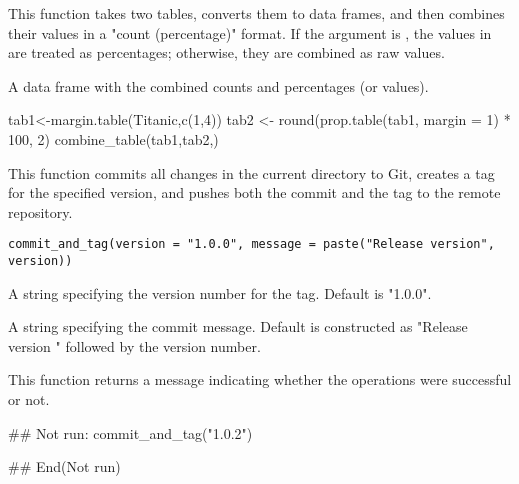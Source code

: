 \documentclass[a4paper]{book}
\begin{document}
%
\begin{Details}
This function takes two tables, converts them to data frames, and then combines their values in a "count (percentage)" format. If the  argument is , the values in  are treated as percentages; otherwise, they are combined as raw values.
\end{Details}
%
\begin{Value}
A data frame with the combined counts and percentages (or values).
\end{Value}
%
\begin{Examples}
\begin{ExampleCode}
tab1<-margin.table(Titanic,c(1,4))
tab2 <- round(prop.table(tab1, margin = 1) * 100, 2)
combine_table(tab1,tab2,)

\end{ExampleCode}
\end{Examples}
%
\begin{Description}
This function commits all changes in the current directory to Git, creates a
tag for the specified version, and pushes both the commit and the tag to the
remote repository.
\end{Description}
%
\begin{Usage}
\begin{verbatim}
commit_and_tag(version = "1.0.0", message = paste("Release version", version))
\end{verbatim}
\end{Usage}
%
\begin{Arguments}
\begin{ldescription}
\item[\code{version}] A string specifying the version number for the tag. Default is "1.0.0".

\item[\code{message}] A string specifying the commit message. Default is constructed as "Release version " followed by the version number.
\end{ldescription}
\end{Arguments}
%
\begin{Value}
This function returns a message indicating whether the operations were successful or not.
\end{Value}
%
\begin{Examples}
\begin{ExampleCode}
## Not run: 
  commit_and_tag("1.0.2")

## End(Not run)

\end{ExampleCode}
\end{Examples}
\end{document}
